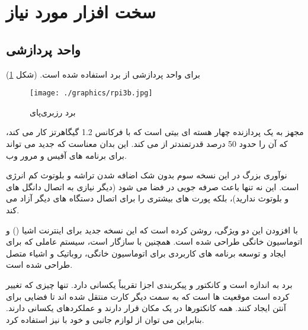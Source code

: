\documentclass{article}
\begin{document}
\section{سخت افزار مورد نیاز}
\subsection{واحد پردازشی}
برای واحد پردازشی از برد  استفاده شده است. \cite{pi} (شکل \ref{RPi3})
 
\begin{figure}
	\centering
	\texttt{[image: ./graphics/rpi3b.jpg]}
	\caption{برد رزبری‌پای}
	\label{RPi3}
\end{figure}

 مجهز به یک پردازنده چهار هسته ای  بیتی  است که با فرکانس 1.2 گیگاهرتز کار می کند، که آن را حدود 50 درصد قدرتمندتر از  می کند. این بدان معناست که  جدید می تواند برای برنامه های آفیس و مرور وب.

نوآوری بزرگ در این نسخه سوم بدون شک اضافه شدن تراشه  و بلوتوث کم انرژی است. این نه تنها باعث صرفه جویی در فضا می شود (دیگر نیازی به اتصال دانگل های  و بلوتوث ندارید)، بلکه پورت های  بیشتری را برای اتصال دستگاه های دیگر آزاد می کند.

با افزودن این دو ویژگی،  روشن کرده است که این نسخه جدید برای اینترنت اشیا () و اتوماسیون خانگی طراحی شده است.  همچنین با سازگار است، سیستم عاملی که برای ایجاد و توسعه برنامه های کاربردی برای اتوماسیون خانگی، روباتیک و اشیاء متصل طراحی شده است.

برد  به اندازه  است و کانکتور و پیکربندی اجزا تقریباً یکسانی دارد. تنها چیزی که تغییر کرده است موقعیت  ها است که به سمت دیگر کارت  منتقل شده اند تا فضایی برای آنتن  ایجاد کنند. همه کانکتورها در یک مکان قرار دارند و عملکردهای یکسانی دارند. بنابراین می توان از لوازم جانبی  و  خود با  نیز استفاده کرد.
\end{document}
